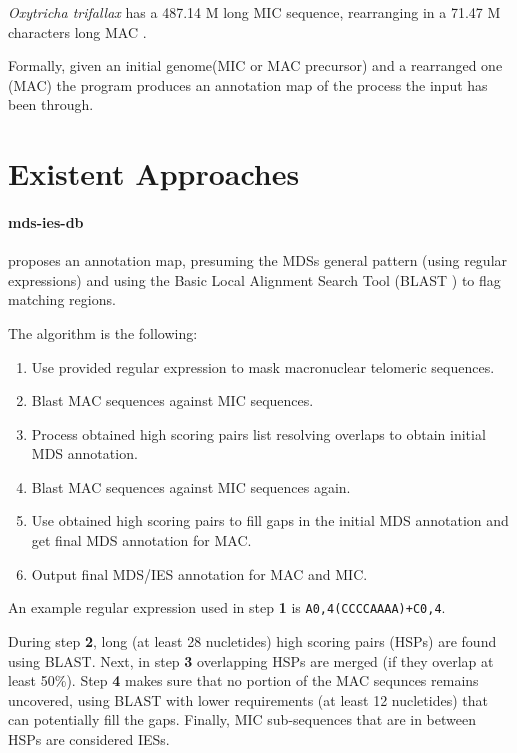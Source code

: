 \textit{Oxytricha trifallax} has a 487.14 M long MIC sequence, rearranging in a 71.47 M characters long MAC \cite{mdsiesdb}.

Formally, given an initial genome(MIC or MAC precursor) and a rearranged one (MAC) the program produces an annotation map of the process the input has been through.

\section{Existent Approaches}

\paragraph{mds-ies-db}\cite{mdsiesdb} proposes an annotation map, presuming the MDSs general pattern (using regular expressions) and using the Basic Local Alignment Search Tool (BLAST \cite{boratyn2013blast}) to flag matching regions.

The algorithm is the following:

\begin{enumerate}
  \item Use provided regular expression to mask macronuclear telomeric sequences.
  \item Blast MAC sequences against MIC sequences.
  \item Process obtained high scoring pairs list resolving overlaps to obtain initial MDS annotation.
  \item Blast MAC sequences against MIC sequences again.
  \item Use obtained high scoring pairs to fill gaps in the initial MDS annotation and get final MDS annotation for MAC.
  \item Output final MDS/IES annotation for MAC and MIC.
\end{enumerate}

An example regular expression used in step \textbf{1} is \texttt{A{0,4}(CCCCAAAA)+C{0,4}}.

During step \textbf{2}, long (at least 28 nucletides) high scoring pairs (HSPs) are found using BLAST. Next, in step \textbf{3} overlapping HSPs are merged (if they overlap at least 50\%).
Step \textbf{4} makes sure that no portion of the MAC sequnces remains uncovered, using BLAST with lower requirements (at least 12 nucletides) that can potentially fill the gaps.
Finally, MIC sub-sequences that are in between HSPs are considered IESs.

